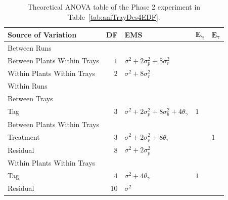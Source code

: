 \begin{table}[!ht]
 \caption{Theoretical ANOVA table of the Phase 2 experiment in Table~\ref{tab:aniTrayDes4EDF}.}
 \begin{tabular}[t]{lrlll} 
 \toprule 
 \multicolumn{1}{l}{\textbf{Source of Variation}} & \multicolumn{1}{l}{\textbf{DF}} & \multicolumn{1}{l}{\textbf{EMS}}& \multicolumn{1}{l}{$\bm{E_{\gamma}}$}&\multicolumn{1}{l}{$\bm{E_{\tau}}$}\\ 
 \midrule 
 Between Runs &  &  & & \\ 
 \quad Between Plants Within Trays & $1$ & $\sigma^2+2\sigma_{p}^2+8\sigma_{r}^2$ & & \\ 
 \quad Within Plants Within Trays & $2$ & $\sigma^2+8\sigma_{r}^2$ & & \\ \hline 
 Within Runs &  &  & & \\ 
 \quad Between Trays &  &  & & \\ 
 \quad \quad Tag & $3$ & $\sigma^2+2\sigma_{p}^2+8\sigma_{b}^2+4\theta_{\gamma}$ &$1$ & \\ \hline 
 \quad Between Plants Within Trays &  &  & & \\ 
 \quad \quad Treatment & $3$ & $\sigma^2+2\sigma_{p}^2+8\theta_{\tau}$ & & $1$\\ 
 \quad \quad Residual & $8$ & $\sigma^2+2\sigma_{p}^2$ & & \\ \hline 
 \quad Within Plants Within Trays &  &  & & \\ 
 \quad \quad Tag & $4$ & $\sigma^2+4\theta_{\gamma}$ &$1$ & \\ 
 \quad \quad Residual & $10$ & $\sigma^2$ & & \\ 
 \bottomrule 
 \end{tabular} 
 \label{tab:ANOVAPhase1RCBD4} 
\end{table} 


